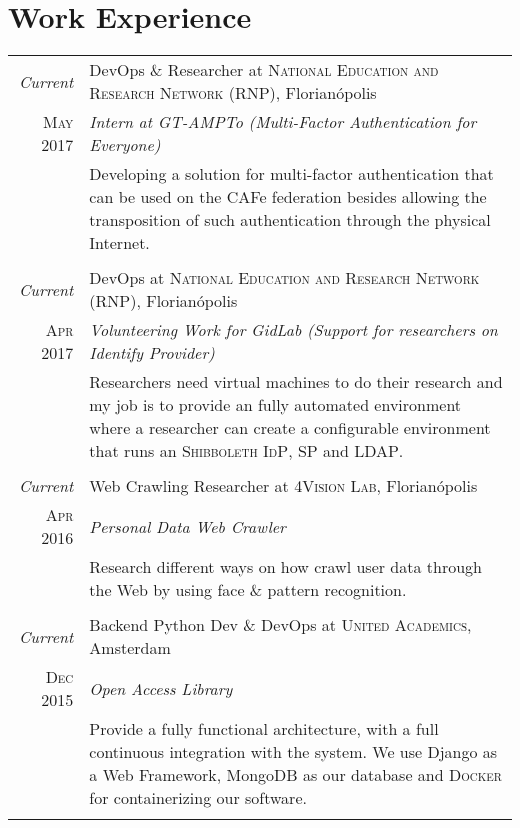 \documentclass[a4paper,10pt]{article}
\begin{document}
\section{Work Experience}
\begin{longtable}{r|p{11cm}}

\emph{Current} & DevOps \& Researcher at \textsc{National Education and Research Network (RNP)}, Florianópolis \\\textsc{May 2017} & \emph{Intern at GT-AMPTo (Multi-Factor Authentication for Everyone)}\\&\footnotesize{Developing a solution for multi-factor authentication that can be used on the CAFe federation besides allowing the transposition of such authentication through the physical Internet.}\\\multicolumn{2}{c}{} \\

\emph{Current} & DevOps at \textsc{National Education and Research Network (RNP)}, Florianópolis \\\textsc{Apr 2017} & \emph{Volunteering Work for GidLab (Support for researchers on Identify Provider)}\\&\footnotesize{Researchers need virtual machines to do their research and my job is to provide an fully automated environment where a researcher can create a configurable environment that runs an \textsc{Shibboleth} \textsc{IdP}, \textsc{SP} and \textsc{LDAP}.}\\\multicolumn{2}{c}{} \\

\emph{Current} & Web Crawling Researcher at \textsc{4Vision Lab}, Florianópolis \\\textsc{Apr 2016} & \emph{Personal Data Web Crawler}\\&\footnotesize{Research different ways on how crawl user data through the Web by using face \& pattern recognition.}\\\multicolumn{2}{c}{} \\

\emph{Current} & Backend Python Dev \& DevOps at \textsc{United Academics}, Amsterdam \\\textsc{Dec 2015} & \emph{Open Access Library}\\&\footnotesize{Provide a fully functional architecture, with a full continuous integration with the system. We use Django as a Web Framework, MongoDB as our database and \textsc{Docker} for containerizing our software.}\\\multicolumn{2}{c}{} \\


\end{longtable}
\end{document}
